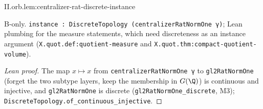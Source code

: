 \begin{lemma}
\bonly
{}
\end{lemma}
\begin{tfformal}{II.orb.lem:centralizer-rat-discrete-instance}
\begin{tffidelity}
B-only. \texttt{instance : DiscreteTopology (centralizerRatNormOne γ)}; Lean plumbing for the measure statements, which need discreteness as an instance argument (\texttt{X.quot.def:quotient-measure} and \texttt{X.quot.thm:compact-quotient-volume}).
\end{tffidelity}
\end{tfformal}
\begin{proof}[Lean proof]
The map $x\mapsto x$ from \texttt{centralizerRatNormOne γ} to \texttt{gl2RatNormOne} (forget the two subtype layers, keep the membership in $G(\Q)$) is continuous and injective, and \texttt{gl2RatNormOne} is discrete (\texttt{gl2RatNormOne\_discrete}, M3); \texttt{DiscreteTopology.of\_continuous\_injective}.
\end{proof}

